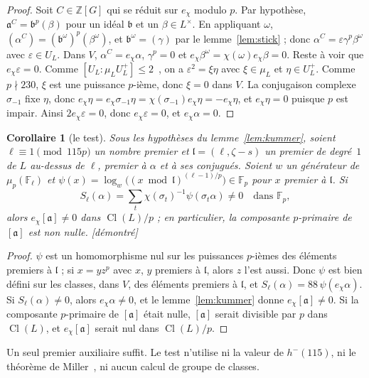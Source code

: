 \documentclass[11pt,a4paper]{amsart}
\theoremstyle{plain}
\newtheorem{corollary}[theorem]{Corollaire}
\theoremstyle{definition}
\newcommand{\Z}{\mathbb{Z}}
\newcommand{\F}{\mathbb{F}}
\newcommand{\aaa}{\mathfrak{a}}
\newcommand{\bb}{\mathfrak{b}}
\newcommand{\lpr}{\mathfrak{l}}
\DeclareMathOperator{\Cl}{Cl}
\newcommand{\st}[1]{\textup{\textsf{\small[#1]}}}
\newcommand{\DEM}{\st{démontré}}
\begin{document}
\begin{proof}
Soit $C\in\Z[G]$ qui se réduit sur $e_\chi$ modulo $p$. Par hypothèse, $\aaa^C=\bb^p(\beta)$ pour un idéal $\bb$ et un $\beta\in L^\times$. En appliquant $\omega$, $(\alpha^C)=(\bb^\omega)^p(\beta^\omega)$, et $\bb^\omega=(\gamma)$ par le lemme~\ref{lem:stick} ; donc $\alpha^C=\varepsilon\gamma^p\beta^\omega$ avec $\varepsilon\in U_L$. Dans $V$, $\alpha^C=e_\chi\alpha$, $\gamma^p=0$ et $e_\chi\beta^\omega=\chi(\omega)e_\chi\beta=0$. Reste à voir que $e_\chi\varepsilon=0$. Comme $[U_L:\mu_LU_L^+]\le2$~\cite[th.~4.12]{Was97}, on a $\varepsilon^2=\xi\eta$ avec $\xi\in\mu_L$ et $\eta\in U_L^+$. Comme $p\nmid230$, $\xi$ est une puissance $p$-ième, donc $\xi=0$ dans $V$. La conjugaison complexe $\sigma_{-1}$ fixe $\eta$, donc $e_\chi\eta=e_\chi\sigma_{-1}\eta=\chi(\sigma_{-1})e_\chi\eta=-e_\chi\eta$, et $e_\chi\eta=0$ puisque $p$ est impair. Ainsi $2e_\chi\varepsilon=0$, donc $e_\chi\varepsilon=0$, et $e_\chi\alpha=0$.
\end{proof}

\begin{corollary}[le test]\label{cor:test}
Sous les hypothèses du lemme~\ref{lem:kummer}, soient $\ell\equiv1\pmod{115p}$ un nombre premier et $\lpr=(\ell,\zeta-s)$ un premier de degré~$1$ de $L$ au-dessus de $\ell$, premier à $\alpha$ et à ses conjugués. Soient $w$ un générateur de $\mu_p(\F_\ell)$ et $\psi(x)=\log_w\bigl((x\bmod\lpr)^{(\ell-1)/p}\bigr)\in\F_p$ pour $x$ premier à $\lpr$. Si
\[
S_\ell(\alpha)=\sum_t\chi(\sigma_t)^{-1}\psi(\sigma_t\alpha)\neq0\quad\text{dans }\F_p,
\]
alors $e_\chi[\aaa]\neq0$ dans $\Cl(L)/p$ ; en particulier, la composante $p$-primaire de $[\aaa]$ est non nulle. \DEM
\end{corollary}

\begin{proof}
$\psi$ est un homomorphisme nul sur les puissances $p$-ièmes des éléments premiers à $\lpr$ ; si $x=yz^p$ avec $x$, $y$ premiers à $\lpr$, alors $z$ l'est aussi. Donc $\psi$ est bien défini sur les classes, dans $V$, des éléments premiers à $\lpr$, et $S_\ell(\alpha)=88\,\psi(e_\chi\alpha)$. Si $S_\ell(\alpha)\ne0$, alors $e_\chi\alpha\ne0$, et le lemme~\ref{lem:kummer} donne $e_\chi[\aaa]\ne0$. Si la composante $p$-primaire de $[\aaa]$ était nulle, $[\aaa]$ serait divisible par $p$ dans $\Cl(L)$, et $e_\chi[\aaa]$ serait nul dans $\Cl(L)/p$.
\end{proof}

Un seul premier auxiliaire suffit. Le test n'utilise ni la valeur de $h^-(115)$, ni le théorème de Miller~\cite{Mil14}, ni aucun calcul de groupe de classes.
\end{document}

